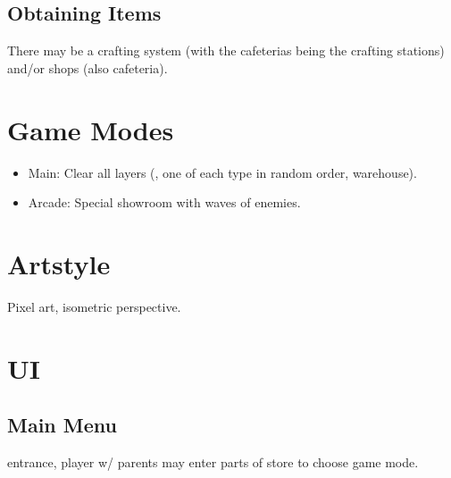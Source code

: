 \documentclass[a4paper]{article}
\theoremstyle{definition}
\theoremstyle{remark}
\begin{document}
\subsection{Obtaining Items}

There may be a crafting system (with the cafeterias being the crafting
stations) and/or shops (also cafeteria).

\section{Game Modes}

\begin{itemize}
  \item Main: Clear all layers (\smaland, one of each type in random
    order, warehouse).
  \item Arcade: Special showroom with waves of enemies.
\end{itemize}

\section{Artstyle}

Pixel art,
isometric perspective.

\section{UI}

\subsection{Main Menu}

\ikea entrance, player w/ parents may enter parts of store to choose
game mode.

%
%
\end{document}
